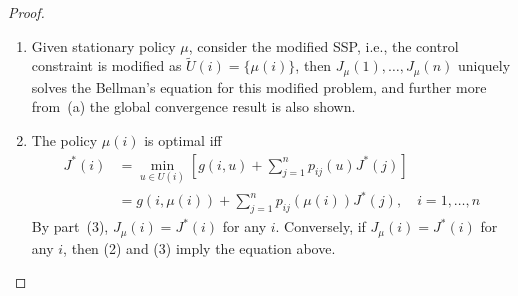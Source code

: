 \begin{proof}
\begin{enumerate}
\item
Given stationary policy $\mu$, consider the modified SSP, i.e., the control constraint is modified as $\tilde{U}(i)=\{\mu(i)\}$, then $J_\mu(1),\dots,J_\mu(n)$ uniquely solves the Bellman's equation for this modified problem, and further more from~(a) the global convergence result is also shown.
\item
The policy $\mu(i)$ is optimal iff
\begin{align*}
J^*(i)&=\min_{u\in U(i)}\left[
g(i,u)+\sum_{j=1}^np_{ij}(u)J^*(j)
\right]\\
&=g(i,\mu(i))+\sum_{j=1}^np_{ij}(\mu(i))J^*(j),\quad
i=1,\dots,n
\end{align*}
By part~(3), $J_\mu(i)=J^*(i)$ for any $i$.
Conversely, if $J_\mu(i)=J^*(i)$ for any $i$, then (2) and (3) imply the equation above.

\end{enumerate}
\end{proof}

